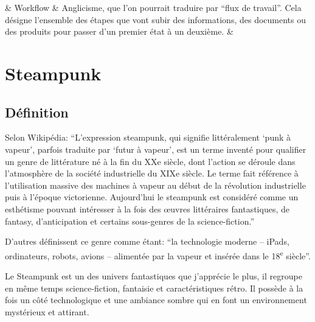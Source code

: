 \begin{center}
\begin{longtabu}
		& Workflow & Anglicisme, que l'on pourrait traduire par \enquote{flux de travail}. Cela désigne l'ensemble des étapes que vont subir des informations, des documents ou des produits pour passer d'un premier état à un deuxième.\cite{Workflow_} & \\
	\end{longtabu}
\end{center}


\chapter{Steampunk}
\label{app:steampunk}

\hspace*{4.5cm}
\begin{minipage}{\textwidth-4.5cm}
	\section*{Définition}
	\setlength{\parskip}{\currentparskip}
	Selon Wikipédia: \enquote{L'expression steampunk, qui signifie littéralement \enquote{punk à vapeur}, parfois traduite par \enquote{futur à vapeur}, est un terme inventé pour qualifier un genre de littérature né à la fin du XXe siècle, dont l'action se déroule dans l'atmosphère de la société industrielle du XIXe siècle. Le terme fait référence à l'utilisation massive des machines à vapeur au début de la révolution industrielle puis à l'époque victorienne. Aujourd'hui le steampunk est considéré comme un esthétisme pouvant intéresser à la fois des œuvres littéraires fantastiques, de fantasy, d'anticipation et certains sous-genres de la science-fiction.}\cite{Steampunk_}
	
	D'autres définissent ce genre comme étant: \enquote{la technologie moderne -- iPads, ordinateurs, robots, avions -- alimentée par la vapeur et insérée dans le 18\textsuperscript{e} siècle}.\cite{Whatissteampunk_}
	
	Le Steampunk est un des univers fantastiques que j'apprécie le plus, il regroupe en même temps science-fiction, fantaisie et caractéristiques rétro. Il possède à la fois un côté technologique et une ambiance sombre qui en font un environnement mystérieux et attirant.
\end{minipage}

\newpage
